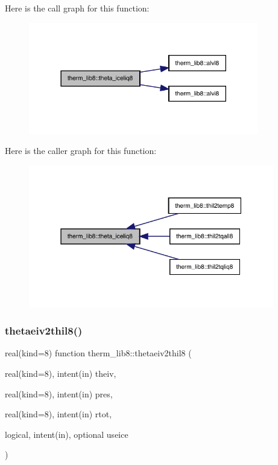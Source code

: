 Here is the call graph for this function\+:
\nopagebreak
\begin{figure}[H]
\begin{center}
\leavevmode
\includegraphics[width=285pt]{namespacetherm__lib8_a7d5573528d5f5adeb9beb594eead7f4f_cgraph}
\end{center}
\end{figure}
Here is the caller graph for this function\+:
\nopagebreak
\begin{figure}[H]
\begin{center}
\leavevmode
\includegraphics[width=304pt]{namespacetherm__lib8_a7d5573528d5f5adeb9beb594eead7f4f_icgraph}
\end{center}
\end{figure}
\mbox{\label{namespacetherm__lib8_aeb2f84da15d0d99455778580d72dbde5}} 
\subsubsection{\texorpdfstring{thetaeiv2thil8()}{thetaeiv2thil8()}}
{\footnotesize\ttfamily real(kind=8) function therm\+\_\+lib8\+::thetaeiv2thil8 (\begin{DoxyParamCaption}\item[{real(kind=8), intent(in)}]{theiv,  }\item[{real(kind=8), intent(in)}]{pres,  }\item[{real(kind=8), intent(in)}]{rtot,  }\item[{logical, intent(in), optional}]{useice }\end{DoxyParamCaption})}

